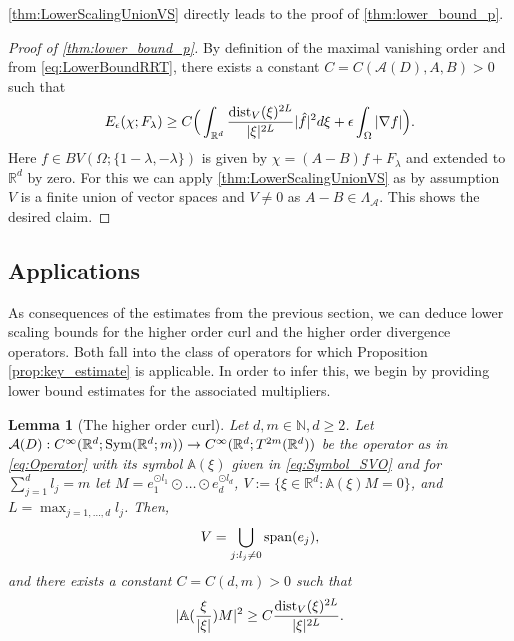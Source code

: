 \documentclass[a4paper, 10pt, twoside, notitlepage]{amsart}
\theoremstyle{plain}
\newtheorem{lem}[prop]{Lemma}
\newcommand{\R}{\mathbb{R}}
\newcommand{\N}{\mathbb{N}}
\newcommand{\A}{\mathcal{A}}
\renewcommand{\AA}{\mathbb{A}}
\renewcommand{\S}[1]{\textup{Sym}(\R^d;#1)}
\begin{document}
  \cref{thm:LowerScalingUnionVS} directly leads to the proof of \cref{thm:lower_bound_p}.
  
                             
                              \begin{proof}[Proof of \cref{thm:lower_bound_p}]
                                By definition of the maximal vanishing order and from \eqref{eq:LowerBoundRRT}, there exists a constant $C = C(\A(D),A,B)>0$ such that
                                \begin{align*}
                                  E_{\epsilon}(\chi;F_\lambda) \geq C \Big( \int_{\R^d} \frac{\dist_V(\xi)^{2L}}{|\xi|^{2L}} |\hat{f}|^2 d\xi + \epsilon \int_\Omega |\nabla f|\Big).
                                \end{align*}
                                Here $f \in BV(\Omega;\{1-\lambda,-\lambda\})$ is given by $\chi = (A-B)f + F_\lambda$ and extended to $\R^d$ by zero.
                                For this we can apply \cref{thm:LowerScalingUnionVS} as by assumption $V$ is a finite union of vector spaces and $V \neq 0$ as $A-B \in \Lambda_\A$.
                                This shows the desired claim.
                              \end{proof}
                            


                  
		
		\subsection{Applications} 
		\label{sec:Applications} 
		As consequences of the estimates from the previous section, we can deduce lower scaling bounds for the higher order curl and the higher order divergence operators. Both fall into the class of operators for which Proposition \ref{prop:key_estimate} is applicable. In order to infer this, we begin by providing lower bound estimates for the associated multipliers. 
		
		\begin{lem}[The higher order curl]
			\label{lem:LowerBoundMultipl}
			Let $d,m \in \N, d \geq 2$. Let $\A(D):C^\infty(\R^d;\S{m}) \to C^\infty(\R^d;T^{2m}(\R^d))$ be the operator as in \eqref{eq:Operator} with its symbol $\AA(\xi)$ given in \eqref{eq:Symbol_SVO} and for $\sum_{j=1}^d l_j = m$ let $M = e_1^{\odot l_1} \odot \dots \odot e_d^{\odot l_d}$, $V := \{\xi \in \R^d: \AA(\xi)M = 0\} $, and $L = \max_{j=1,\dots,d} l_j$.
			Then,
\begin{align}
\label{eq:zero_set}
V = \bigcup_{j: l_j \neq 0} \operatorname{span}(e_j),
\end{align}			
			and there exists a constant $C = C(d,m) > 0$ such that
			\begin{align}
			\label{eq:LowerSymbol1}
				|\AA(\frac{\xi}{|\xi|})M|^2 \geq C \frac{\dist_V(\xi)^{2L}}{|\xi|^{2L}}.
			\end{align}
		\end{lem}
		
\end{document}
